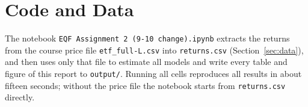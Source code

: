 \documentclass[10pt,a4paper]{article}
\begin{document}
\section{Code and Data}
The notebook \texttt{EQF Assignment 2 (9-10 change).ipynb} extracts the returns from the course price
file \texttt{etf\_full-L.csv} into \texttt{returns.csv} (Section~\ref{sec:data}), and then uses only that
file to estimate all models and write every table and figure of this report to \texttt{output/}. Running
all cells reproduces all results in about fifteen seconds; without the price file the notebook starts from
\texttt{returns.csv} directly.
\end{document}
